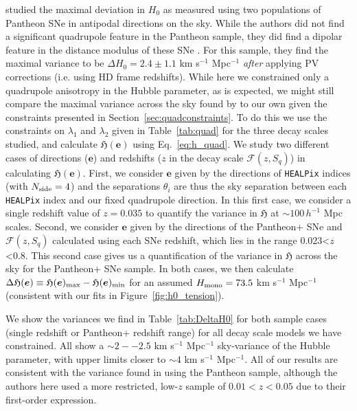 \documentclass[fleqn,usenatbib]{mnras}
\begin{document}
\citet{Kalbouneh:2022tfw} studied the maximal deviation in $H_0$ as measured using two populations of Pantheon SNe in antipodal directions on the sky. While the authors did not find a significant quadrupole feature in the Pantheon sample, they did find a dipolar feature in the distance modulus of these SNe \citep[which can most likely be attributed to anisotropy in the effective deceleration parameter, see][]{Heinesen_2021,Heinesen_Macpherson_2021_Hubble_flow}. For this sample, they find the maximal variance to be $\Delta H_0 = 2.4 \pm 1.1$ km s$^{-1}$ Mpc$^{-1}$ \textit{after} applying PV corrections (i.e. using HD frame redshifts). 
While here we constrained only a quadrupole anisotropy in the Hubble parameter, as is expected, we might still compare the maximal variance across the sky found by \citet{Kalbouneh:2022tfw} to our own given the constraints presented in Section~\ref{sec:quadconstraints}.
To do this we use the constraints on $\lambda_1$ and $\lambda_2$ given in Table~\ref{tab:quad} for the three decay scales studied, and calculate $\mathfrak{H}(\boldsymbol{e})$ using Eq.~\ref{eq:h_quad}. {We study two different cases of directions ($\boldsymbol{e}$) and redshifts ($z$ in the decay scale $\mathcal{F}(z,S_q)$) in calculating $\mathfrak{H}(\boldsymbol{e})$. First, we consider $\boldsymbol{e}$} 
given by the directions of \texttt{HEALPix} indices (with $N_{\rm side}=4$) and the separations $\theta_i$ are thus the sky separation between each \texttt{HEALPix} index and our fixed quadrupole direction. {In this first case, we consider a single redshift value of $z=0.035$ to quantify the variance in $\mathfrak{H}$ at $\sim 100 \, h^{-1}$ Mpc scales. 
Second, we consider $\boldsymbol{e}$ given by the directions of the Pantheon+ SNe and $\mathcal{F}(z,S_q)$ calculated using each SNe redshift, which lies in the range 0.023<$z$<0.8. This second case gives us a quantification of the variance in $\mathfrak{H}$ across the sky for the Pantheon+ SNe sample. In both cases, }
we then calculate $\Delta \mathfrak{H}(\boldsymbol{e})\equiv \mathfrak{H}(\boldsymbol{e})_{\rm max} - \mathfrak{H}(\boldsymbol{e})_{\rm min}$ for an assumed $H_{\rm mono} = 73.5$ km s$^{-1}$ Mpc$^{-1}$ (consistent with our fits in Figure~\ref{fig:h0_tension}). 

We show the variances we find in Table~\ref{tab:DeltaH0} {for both sample cases (single redshift or Pantheon+ redshift range) for all decay scale models we have constrained}. All show a $\sim 2--2.5$ km s$^{-1}$ Mpc$^{-1}$ sky-variance of the Hubble parameter, with upper limits closer to $\sim 4$ km s$^{-1}$ Mpc$^{-1}$. 
All of our results are consistent with the variance found in \citet{Kalbouneh:2022tfw} using the Pantheon sample{, although the authors here used a more restricted, low-$z$ sample of $0.01 < z < 0.05$ due to their first-order expression.}
\end{document}
